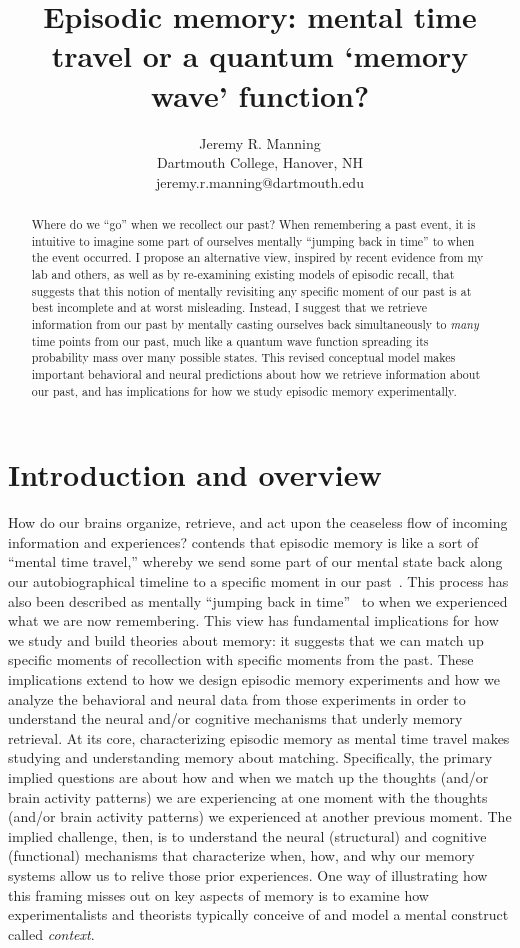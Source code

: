 \documentclass{article}
\title{Episodic memory: mental time travel or a quantum `memory wave' function?}
\author{Jeremy R. Manning\\Dartmouth College, Hanover, NH\\jeremy.r.manning@dartmouth.edu}
\begin{document}
\maketitle

\begin{abstract}
Where do we ``go'' when we recollect our past?  When remembering a past event, it is intuitive to imagine some part of ourselves mentally ``jumping back in time'' to when the event occurred. I propose an alternative view, inspired by recent evidence from my lab and others, as well as by re-examining existing models of episodic recall, that suggests that this notion of mentally revisiting any specific moment of our past is at best incomplete and at worst misleading.  Instead, I suggest that we retrieve information from our past by mentally casting ourselves back simultaneously to \textit{many} time points from our past, much like a quantum wave function spreading its probability mass over many possible states.  This revised conceptual model makes important behavioral and neural predictions about how we retrieve information about our past, and has implications for how we study episodic memory experimentally.
\end{abstract}

\section*{Introduction and overview}
How do our brains organize, retrieve, and act upon the ceaseless flow of incoming information and experiences?  \cite{Tulv83} contends that episodic memory is like a sort of ``mental time travel,'' whereby we send some part of our mental state back along our autobiographical timeline to a specific moment in our past~\citep[also see][]{Tulv72, HassEtal07b, SchaEtal07, MannEtal11}.  This process has also been described as mentally ``jumping back in time''~\citep[e.g.,][]{HowaEtal12, FolkEtal18} to when we experienced what we are now remembering.  This view has fundamental implications for how we study and build theories about memory: it suggests that we can match up specific moments of recollection with specific moments from the past.  These implications extend to how we design episodic memory experiments and how we analyze the behavioral and neural data from those experiments in order to understand the neural and/or cognitive mechanisms that underly memory retrieval.  At its core, characterizing episodic memory as mental time travel makes studying and understanding memory about matching.  Specifically, the primary implied questions are about how and when we match up the thoughts (and/or brain activity patterns) we are experiencing at one moment with the thoughts (and/or brain activity patterns) we experienced at another previous moment.  The implied challenge, then, is to understand the neural (structural) and cognitive (functional) mechanisms that characterize when, how, and why our memory systems allow us to relive those prior experiences.  One way of illustrating how this framing misses out on key aspects of memory is to examine how experimentalists and theorists typically conceive of and model a mental construct called \textit{context}.
\end{document}
